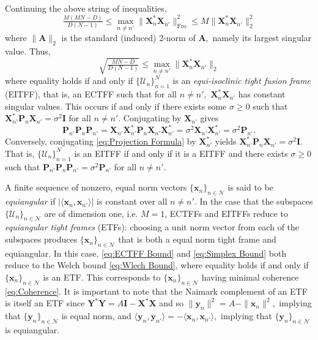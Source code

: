 \documentclass[3p,11pt]{elsarticle}
\newcommand{\bfA}{\mathbf{A}}
\newcommand{\bfI}{\mathbf{I}}
\newcommand{\bfP}{\mathbf{P}}
\newcommand{\bfx}{\mathbf{x}}
\newcommand{\bfX}{\mathbf{X}}
\newcommand{\bfy}{\mathbf{y}}
\newcommand{\bfY}{\mathbf{Y}}
\newcommand{\calN}{\mathcal{N}}
\newcommand{\calU}{\mathcal{U}}
\newcommand{\Fro}{\mathrm{Fro}}
\newcommand{\abs}[1]{|{#1}|}
\newcommand{\norm}[1]{\|{#1}\|}
\newcommand{\ip}[2]{\langle{#1},{#2}\rangle}
\theoremstyle{definition}
\begin{document}
Continuing the above string of inequalities, $$\tfrac{M(MN-D)}{D(N-1)}\leq\max_{n\not=n'}\norm{\bfX_n^*\bfX_{n'}^{}}_\Fro^2\leq M\norm{\bfX_n^*\bfX_{n'}^{}}_2^2$$ where $\norm{\bfA}_2$ is the standard (induced) 2-norm of $\bfA,$ namely its largest singular value. Thus, 
\begin{equation}
\label{eq:Simplex Bound}
    \sqrt{\tfrac{MN-D}{D(N-1)}}\leq\max_{n\not=n'}\norm{\bfX_n^*\bfX_{n'}^{}}_2
\end{equation}
where equality holds if and only if $\{\calU_n\}_{n=1}^N$ is an \textit{equi-isoclinic tight fusion frame} (EITFF), that is, an ECTFF such that for all $n\not=n',$ $\bfX_n^*\bfX_{n'}^{}$ has constant singular values. This occurs if and only if there exists some $\sigma\geq 0$ such that $\bfX_{n'}^*\bfP_n^{}\bfX_{n'}^{}=\sigma^2\bfI$ for all $n\not=n'.$ Conjugating by $\bfX_{n'}$ gives \begin{equation}\label{eq:Projection Formula}
    \bfP_{n'}^{}\bfP_n^{}\bfP_{n'}^{}=\bfX_{n'}^{}\bfX_{n'}^*\bfP_n^{}\bfX_{n'}^{}\bfX_{n'}^*=\sigma^2\bfX_{n'}^{}\bfX_{n'}^*=\sigma^2\bfP_{n'}^{}.
\end{equation} Conversely, conjugating \eqref{eq:Projection Formula} by $\bfX_{n'}^*$ yields $\bfX_{n'}^*\bfP_n^{}\bfX_{n'}^{}=\sigma^2\bfI.$ That is, $\{\calU_n\}_{n=1}^N$ is an EITFF if and only if it is a EITFF and there exists $\sigma\geq0$ such that $\bfP_{n'}\bfP_n\bfP_{n'}=\sigma^2\bfP_{n'}$ for all $n\not= n'.$

A finite sequence of nonzero, equal norm vectors $\{\bfx_n\}_{n\in\calN}$ is said to be \textit{equiangular} if $\abs{\ip{\bfx_n}{\bfx_{n'}}}$ is constant over all $n\not=n'.$ In the case that the subspaces $\{\calU_n\}_{n\in\calN}$ are of dimension one, i.e. $M=1$, ECTFFs and EITFFs reduce to \textit{equiangular tight frames} (ETFs): choosing a unit norm vector from each of the subspaces produces $\{\bfx_n\}_{n\in\calN}$ that is both a equal norm tight frame and equiangular. In this case, \eqref{eq:ECTFF Bound} and \eqref{eq:Simplex Bound} both reduce to the Welch bound \eqref{eq:Wlech Bound}, where equality holds if and only if $\{\bfx_n\}_{n\in\calN}$ is an ETF. This corresponds to $\{\bfx_n\}_{n\in\calN}$ having minimal coherence \eqref{eq:Coherence}. It is important to note that the Naimark complement of an ETF is itself an ETF since $\bfY^*\bfY=A\bfI-\bfX^*\bfX$ and so $\norm{\bfy_n}^2=A-\norm{\bfx_n}^2,$ implying that $\{\bfy_n\}_{n\in\calN}$ is equal norm, and $\ip{\bfy_n}{\bfy_{n'}}=-\ip{\bfx_n}{\bfx_{n'}},$ implying that $\{\bfy_n\}_{n\in\calN}$ is equiangular.
\end{document}
